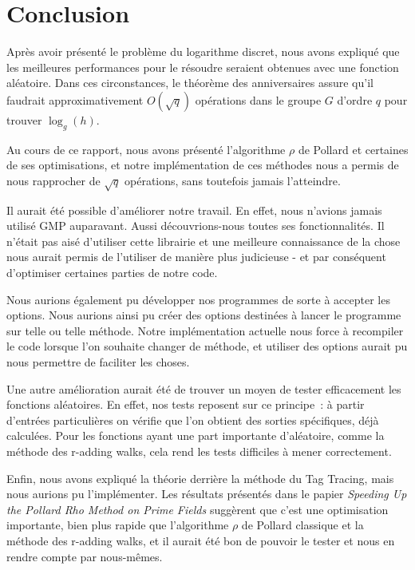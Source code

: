 \chapter*{Conclusion}
Après avoir présenté le problème du logarithme discret, nous avons expliqué que les meilleures performances pour le résoudre seraient obtenues avec une fonction aléatoire. Dans ces circonstances, le théorème des anniversaires assure qu'il faudrait approximativement $O(\sqrt{q})$ opérations dans le groupe $G$ d'ordre $q$ pour trouver $\log_g(h)$.

Au cours de ce rapport, nous avons présenté l'algorithme $\rho$ de Pollard et certaines de ses optimisations, et notre implémentation de ces méthodes nous a permis de nous rapprocher de $\sqrt{q}$ opérations, sans toutefois jamais l'atteindre.

Il aurait été possible d'améliorer notre travail. En effet, nous n'avions jamais utilisé GMP auparavant. Aussi découvrions-nous toutes ses fonctionnalités. Il n'était pas aisé d'utiliser cette librairie et une meilleure connaissance de la chose nous aurait permis de l'utiliser de manière plus judicieuse - et par conséquent d'optimiser certaines parties de notre code.

Nous aurions également pu développer nos programmes de sorte à accepter les options. Nous aurions ainsi pu créer des options destinées à lancer le programme sur telle ou telle méthode. Notre implémentation actuelle nous force à recompiler le code lorsque l'on souhaite changer de méthode, et utiliser des options aurait pu nous permettre de faciliter les choses.

Une autre amélioration aurait été de trouver un moyen de tester efficacement les fonctions aléatoires. En effet, nos tests reposent sur ce principe~: à partir d'entrées particulières on vérifie que l'on obtient des sorties spécifiques, déjà calculées. Pour les fonctions ayant une part importante d'aléatoire, comme la méthode des r-adding walks, cela rend les tests difficiles à mener correctement.

Enfin, nous avons expliqué la théorie derrière la méthode du Tag Tracing, mais nous aurions pu l'implémenter. Les résultats présentés dans le papier \textit{Speeding Up the Pollard Rho Method on Prime Fields} \autocite[13]{pollard1} suggèrent que c'est une optimisation importante, bien plus rapide que l'algorithme $\rho$ de Pollard classique et la méthode des r-adding walks, et il aurait été bon de pouvoir le tester et nous en rendre compte par nous-mêmes.
